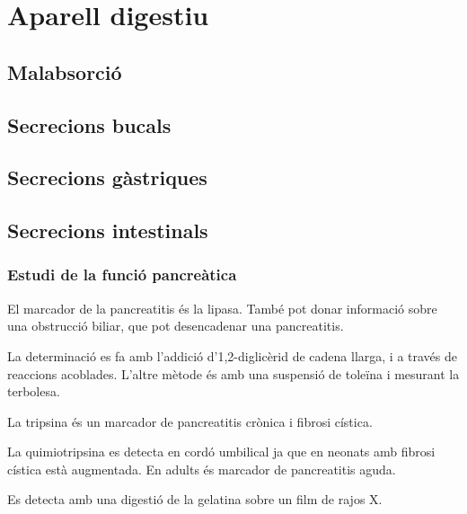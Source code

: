 
\section{Aparell digestiu}
\label{sec:aparell-digestiu}

\subsection{Malabsorció}
\label{sec:malabsorcio}

\subsection{Secrecions bucals}
\label{sec:secrecions-bucals}

\subsection{Secrecions gàstriques}
\label{sec:secr-gastr}

\subsection{Secrecions intestinals}
\label{sec:secr-intest}

\subsubsection{Estudi de la funció pancreàtica}
\label{sec:estudi-de-la}

El marcador de la pancreatitis és la lipasa. També pot donar informació sobre una obstrucció biliar, que pot desencadenar una pancreatitis.

La determinació es fa amb l'addició d'1,2-diglicèrid de cadena llarga, i a través de reaccions acoblades. L'altre mètode és amb una suspensió de toleïna i mesurant la terbolesa.

La tripsina és un marcador de pancreatitis crònica i fibrosi cística.

La quimiotripsina es detecta en cordó umbilical ja que en neonats amb fibrosi cística està augmentada. En adults és marcador de pancreatitis aguda.

Es detecta amb una digestió de la gelatina sobre un film de rajos X.

